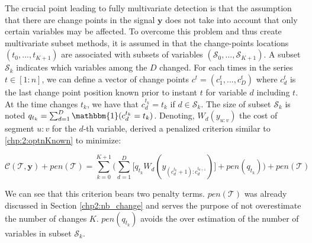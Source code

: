 The crucial point leading to fully multivariate detection is that the assumption that there are change points in the signal $\bm y$ does not take into account that only certain variables may be affected. To overcome this problem and thus create multivariate subset methods, it is assumed in \cite{pickering2016changepoint} that the change-points locations $(t_0,...,t_{K+1})$ are associated with subsets of variables $(\mathcal{S}_0,...,\mathcal{S}_{K+1})$. A subset $\mathcal{S}_k$ indicates which variables among the $D$ changed. For each times in the series $t \in [1:n]$, we can define a vector of change points $c^t = (c_1^t,...,c_D^t)$ where $c_d^t$ is the last change point position known prior to instant $t$ for variable $d$ including $t$. At the time changes $t_k$, we have that $c_d^{t_k} = t_k$ if $d \in \mathcal{S}_k$. The size of subset $\mathcal{S}_k$ is noted $q_{t_k} = \sum_{d=1}^D\mathbbm{1}(c_d^{t_k} = t_k)$. Denoting, $W_d(y_{u:v})$ the cost of segment $u:v$ for the $d$-th variable, \cite{pickering2016changepoint} derived a penalized criterion similar to \ref{chp:2:optnKnown} to minimize: 

\begin{equation}\label{chp:2:optnKnownmulti}
\mathcal{C}(\mathcal{T},\bm y) + pen(\mathcal{T}) = \sum_{k = 0}^{K+1}\bigg(\sum_{d=1}^D \bigg[ q_{t_k}W_d(y_{(c^{t_k}_d+1):c^{t_{k+1}}_d})\bigg] + pen(q_{t_k}) \bigg) + pen(\mathcal{T})
\end{equation}      

We can see that this criterion bears two penalty terms. $pen(\mathcal{T})$ was already discussed in Section \ref{chp2:nb_change} and serves the purpose of not overestimate the number of changes $K$. $pen(q_{t_k})$ avoids the over estimation of the number of variables in subset $\mathcal{S}_k$. 




